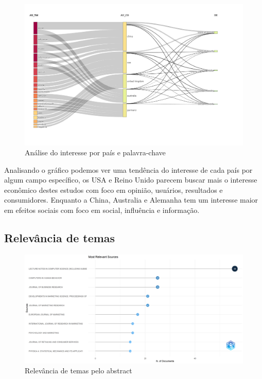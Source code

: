 \begin{figure}
    \centering
    \includegraphics[width=1\textwidth]{exploratory-data-analysis/gabrielligoski/PesqBibliogr/ColorPatches/threeFieldPlot.png}
    \caption{Análise do interesse por país e palavra-chave}
    \label{fig:cit:anual:gabrielligoski}
\end{figure}

Analisando o gráfico podemos ver uma tendência do interesse de cada país por algum campo específico, os USA e Reino Unido parecem buscar mais o interesse econômico destes estudos com foco em opinião, usuários, resultados e consumidores. Enquanto a China, Australia e Alemanha tem um interesse maior em efeitos sociais com foco em social, influência e informação.


\subsection{Relevância de temas}

\begin{figure}
    \centering
    \includegraphics[width=1\textwidth]{exploratory-data-analysis/gabrielligoski/PesqBibliogr/ColorPatches/MostRelevantSources-2022-12-06.png}
    \caption{Relevância de temas pelo abstract}
    \label{fig:cit:anual:gabrielligoski}
\end{figure}

